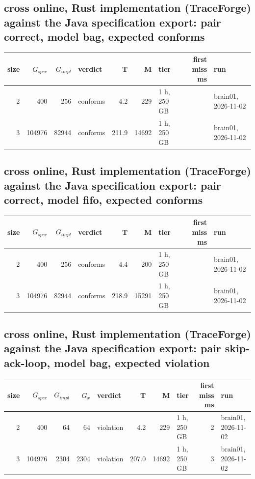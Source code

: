 \documentclass[10pt]{article}
\begin{document}
\subsection*{cross online, Rust implementation (TraceForge) against the Java specification export: pair \textsf{correct}, model bag, expected conforms}
\begin{longtable}{@{}rrrlrrlrl@{}}
\toprule
size & $G_{\mathit{spec}}$ & $G_{\mathit{impl}}$ & verdict & T & M & tier & first miss ms & run \\
\midrule
\endhead
\color{red} 2 & 400 & 256 & conforms & 4.2 & 229 & 1 h, 250 GB &  & brain01, 2026-11-02 \\
\color{red} 3 & 104976 & 82944 & conforms & 211.9 & 14692 & 1 h, 250 GB &  & brain01, 2026-11-02 \\
\bottomrule
\end{longtable}
\subsection*{cross online, Rust implementation (TraceForge) against the Java specification export: pair \textsf{correct}, model fifo, expected conforms}
\begin{longtable}{@{}rrrlrrlrl@{}}
\toprule
size & $G_{\mathit{spec}}$ & $G_{\mathit{impl}}$ & verdict & T & M & tier & first miss ms & run \\
\midrule
\endhead
\color{red} 2 & 400 & 256 & conforms & 4.4 & 200 & 1 h, 250 GB &  & brain01, 2026-11-02 \\
\color{red} 3 & 104976 & 82944 & conforms & 218.9 & 15291 & 1 h, 250 GB &  & brain01, 2026-11-02 \\
\bottomrule
\end{longtable}
\subsection*{cross online, Rust implementation (TraceForge) against the Java specification export: pair \textsf{skip-ack-loop}, model bag, expected violation}
\begin{longtable}{@{}rrrrlrrlrl@{}}
\toprule
size & $G_{\mathit{spec}}$ & $G_{\mathit{impl}}$ & $G_x$ & verdict & T & M & tier & first miss ms & run \\
\midrule
\endhead
\color{red} 2 & 400 & 64 & 64 & violation & 4.2 & 229 & 1 h, 250 GB & 2 & brain01, 2026-11-02 \\
\color{red} 3 & 104976 & 2304 & 2304 & violation & 207.0 & 14692 & 1 h, 250 GB & 3 & brain01, 2026-11-02 \\
\bottomrule
\end{longtable}
\end{document}

